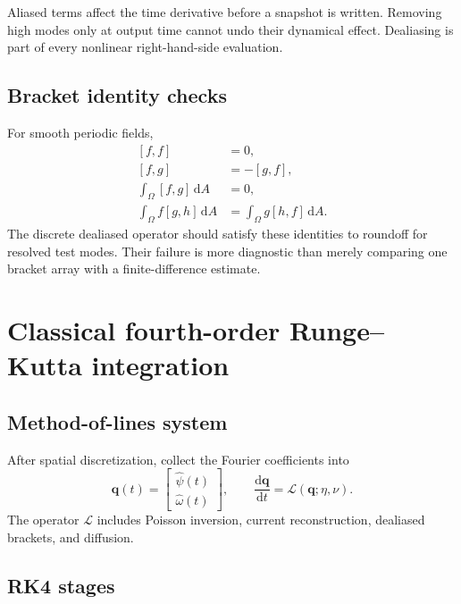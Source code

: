 \documentclass[11pt]{article}
\newcommand{\dd}{\mathrm{d}}
\newcommand{\vect}[1]{\bm{#1}}
\newcommand{\bracket}[2]{\left[#1,#2\right]}
\begin{document}
Aliased terms affect the time derivative before a snapshot is written. Removing high modes only at output time cannot undo their dynamical effect. Dealiasing is part of every nonlinear right-hand-side evaluation.

\subsection{Bracket identity checks}

For smooth periodic fields,
\begin{align}
\bracket{f}{f}&=0,\\
\bracket{f}{g}&=-\bracket{g}{f},\\
\int_\Omega \bracket{f}{g}\,\dd A&=0,\\
\int_\Omega f\bracket{g}{h}\,\dd A
&=\int_\Omega g\bracket{h}{f}\,\dd A.
\end{align}
The discrete dealiased operator should satisfy these identities to roundoff for resolved test modes. Their failure is more diagnostic than merely comparing one bracket array with a finite-difference estimate.

\section{Classical fourth-order Runge--Kutta integration}
\label{sec:time}

\subsection{Method-of-lines system}

After spatial discretization, collect the Fourier coefficients into
\begin{equation}
\vect{q}(t)=
\begin{bmatrix}
\widehat\psi(t)\\
\widehat\omega(t)
\end{bmatrix},
\qquad
\frac{\dd\vect{q}}{\dd t}
=\vect{\mathcal{L}}(\vect{q};\eta,\nu).
\end{equation}
The operator $\vect{\mathcal{L}}$ includes Poisson inversion, current reconstruction, dealiased brackets, and diffusion.

\subsection{RK4 stages}
\end{document}
